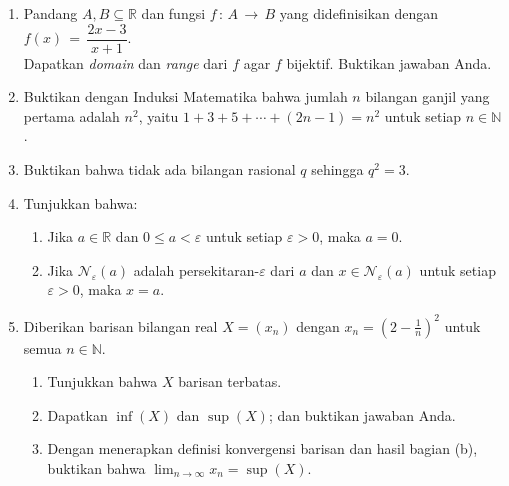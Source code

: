 \documentclass[10pt,openany,a4paper]{article}
\newcommand{\R}{\mathbb{R}}
\newcommand{\N}{\mathbb{N}}
\begin{document}
\begin{enumerate}
    \justifying
    \item Pandang $A,B\subseteq\R$ dan fungsi $f\,:\,A\,\to\,B$ yang didefinisikan dengan $f(x)\,=\,\dfrac{2x-3}{x+1}$.\\
          Dapatkan \textit{domain} dan \textit{range} dari $f$ agar $f$ bijektif. Buktikan jawaban Anda.\\

    \item Buktikan dengan Induksi Matematika bahwa jumlah $n$ bilangan ganjil yang pertama adalah $n^2$, yaitu $1+3+5+\cdots+(2n-1)=n^2$ untuk setiap $n\in\N$.\\

    \item Buktikan bahwa tidak ada bilangan rasional $q$ sehingga $q^2=3$.\\

    \item Tunjukkan bahwa:
          \begin{enumerate}
              \item Jika $a\in\R$ dan $0\leq a< \varepsilon$ untuk setiap $\varepsilon>0$, maka $a=0$.
              \item Jika $\mathcal{N}_\varepsilon(a)$ adalah persekitaran-$\varepsilon$ dari $a$ dan $x\in\mathcal{N}_\varepsilon(a)$ untuk setiap $\varepsilon>0$, maka $x=a$.\\
          \end{enumerate}

    \item Diberikan barisan bilangan real $X=(x_n)$ dengan $x_n=(2-\frac{1}{n})^2$ untuk semua $n\in\N$.
          \begin{enumerate}
              \item Tunjukkan bahwa $X$ barisan terbatas.
              \item Dapatkan $\inf(X)$ dan $\sup(X)$; dan buktikan jawaban Anda.
              \item Dengan menerapkan definisi konvergensi barisan dan hasil bagian (b), buktikan bahwa $\lim_{n\to\infty}x_n=\sup(X)$.
          \end{enumerate}
\end{enumerate}
\end{document}
